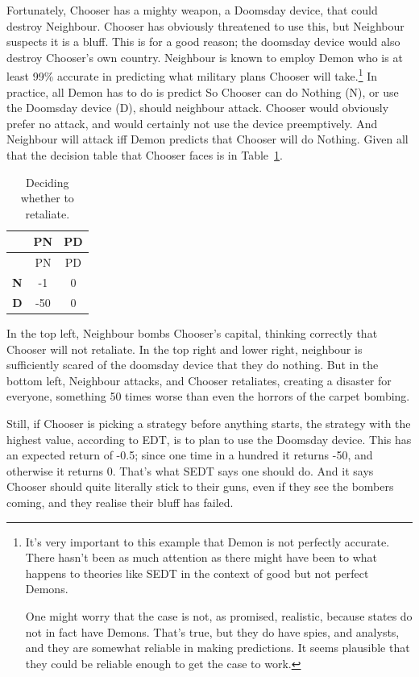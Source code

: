 \documentclass[
  12pt,
  letterpaper,
  DIV=11,
  numbers=noendperiod]{scrreprt}
\begin{document}
Fortunately, Chooser has a mighty weapon, a Doomsday device, that could
destroy Neighbour. Chooser has obviously threatened to use this, but
Neighbour suspects it is a bluff. This is for a good reason; the
doomsday device would also destroy Chooser's own country. Neighbour is
known to employ Demon who is at least 99\% accurate in predicting what
military plans Chooser will take.\footnote{It's very important to this
  example that Demon is not perfectly accurate. There hasn't been as
  much attention as there might have been to what happens to theories
  like SEDT in the context of good but not perfect Demons.

  One might worry that the case is not, as promised, realistic, because
  states do not in fact have Demons. That's true, but they do have
  spies, and analysts, and they are somewhat reliable in making
  predictions. It seems plausible that they could be reliable enough to
  get the case to work.} In practice, all Demon has to do is predict So
Chooser can do Nothing (N), or use the Doomsday device (D), should
neighbour attack. Chooser would obviously prefer no attack, and would
certainly not use the device preemptively. And Neighbour will attack iff
Demon predicts that Chooser will do Nothing. Given all that the decision
table that Chooser faces is in Table~\ref{tbl-retaliation}.

\begin{longtable}[]{@{}ccc@{}}
\caption{Deciding whether to
retaliate.}\label{tbl-retaliation}\tabularnewline
\toprule\noalign{}
& PN & PD \\
\midrule\noalign{}
\endfirsthead
\toprule\noalign{}
& PN & PD \\
\midrule\noalign{}
\endhead
\bottomrule\noalign{}
\endlastfoot
\textbf{N} & -1 & 0 \\
\textbf{D} & -50 & 0 \\
\end{longtable}

In the top left, Neighbour bombs Chooser's capital, thinking correctly
that Chooser will not retaliate. In the top right and lower right,
neighbour is sufficiently scared of the doomsday device that they do
nothing. But in the bottom left, Neighbour attacks, and Chooser
retaliates, creating a disaster for everyone, something 50 times worse
than even the horrors of the carpet bombing.

Still, if Chooser is picking a strategy before anything starts, the
strategy with the highest value, according to EDT, is to plan to use the
Doomsday device. This has an expected return of -0.5; since one time in
a hundred it returns -50, and otherwise it returns 0. That's what SEDT
says one should do. And it says Chooser should quite literally stick to
their guns, even if they see the bombers coming, and they realise their
bluff has failed.
\end{document}
